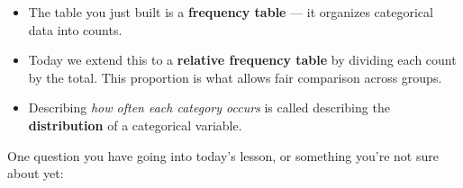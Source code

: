 \documentclass[10pt]{article}
\begin{document}
\vspace{0.14in}

\begin{tcolorbox}[colback=greenbg, colframe=greenacc, boxrule=0.8pt, arc=2mm,
    left=4mm, right=4mm, top=3mm, bottom=3mm]
\small
\begin{itemize}[leftmargin=1.3em, itemsep=6pt]
  \item The table you just built is a \textbf{frequency table} --- it organizes
        categorical data into counts.
  \item Today we extend this to a \textbf{relative frequency table} by dividing each
        count by the total. This proportion is what allows fair comparison across groups.
  \item Describing \textit{how often each category occurs} is called describing the
        \textbf{distribution} of a categorical variable.
\end{itemize}
\end{tcolorbox}

\vspace{0.14in}

\noindent\textcolor{slate}{\small One question you have going into today's lesson, or something
you're not sure about yet:}\\[8pt]
\writeline
\end{document}
